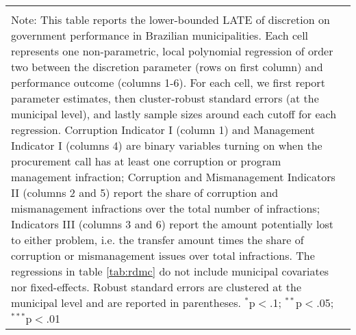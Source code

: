 \documentclass[border = 1pt$]{standalone}
\begin{document}
\begin{tabular}{@{\extracolsep{6pt}}lcccccc}
\\[-1.8ex]\hline
\hline \\[-1.8ex]
\multicolumn{7}{p{.75\textwidth}}{\scriptsize Note: This table reports the lower-bounded LATE of discretion on government performance in Brazilian municipalities. Each cell represents one non-parametric, local polynomial regression of order two between the discretion parameter (rows on first column) and performance outcome (columns 1-6). For each cell, we first report parameter estimates, then cluster-robust standard errors (at the municipal level), and lastly sample sizes around each cutoff for each regression. Corruption Indicator I (column 1) and Management Indicator I (columns 4) are binary variables turning on when the procurement call has at least one corruption or program management infraction; Corruption and Mismanagement Indicators II (columns 2 and 5) report the share of corruption and mismanagement infractions over the total number of infractions; Indicators III (columns 3 and 6) report the amount potentially lost to either problem, i.e. the transfer amount times the share of corruption or mismanagement issues over total infractions. The regressions in table \ref{tab:rdmc} do not include municipal covariates nor fixed-effects. Robust standard errors are clustered at the municipal level and are reported in parentheses. $^{*}$p$<$.1; $^{**}$p$<$.05; $^{***}$p$<$.01} \\
\end{tabular}
\end{document}

